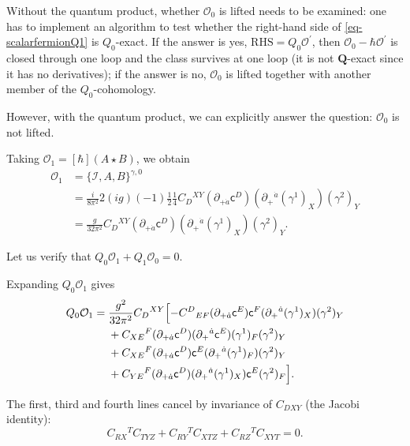 \documentclass[11pt]{article}
\numberwithin{equation}{section}
\numberwithin{figure}{section}
\numberwithin{table}{section}
\begin{document}
Without the quantum product, whether $\mathcal O_0$ is lifted needs to be examined: one has to implement an algorithm to test whether the right-hand side of \eqref{eq-scalarfermionQ1} is $Q_0$-exact. If the answer is yes, $\mathrm{RHS}=Q_0\mathcal O^{\prime}$, then $\mathcal O_0-\hbar\mathcal O^{\prime}$ is closed through one loop and the class survives at one loop (it is not $\mathbf Q$-exact since it has no derivatives); if the answer is no, $\mathcal O_0$ is lifted together with another member of the $Q_0$-cohomology.

However, with the quantum product, we can explicitly answer the question: $\mathcal O_0$ is not lifted.

Taking $\mathcal O_1=[\hbar](A\star B)$, we obtain
\begin{equation}\label{eq-2-65}
\begin{aligned}
\mathcal O_1
&=\{\mathcal I,A,B\}^{\gamma,0}\\
&={\frac{i}{8\pi^2}}
{2(ig)(-1)}
{\frac12}
{\frac14}
C_D{}^{XY}(\partial_{+\dot a}\mathsf c^D)
(\partial_+{}^{\dot a}(\gamma^1)_X)(\gamma^2)_Y\\
&=\frac{g}{32\pi^2}C_D{}^{XY}(\partial_{+\dot a}\mathsf c^D)
(\partial_+{}^{\dot a}(\gamma^1)_X)(\gamma^2)_Y.
\end{aligned}
\end{equation}

Let us verify that $Q_0\mathcal O_1+Q_1\mathcal O_0=0$.

Expanding $Q_0\mathcal O_1$ gives
\begin{equation}\label{eq-scalarfermionexpand}
\begin{aligned}
Q_0\mathcal O_1={}&\frac{g^2}{32\pi^2}C_D{}^{XY}\Bigl[
-C^D{}_{EF}(\partial_{+\dot a}\mathsf c^E)\mathsf c^F
(\partial_+{}^{\dot a}(\gamma^1)_X)(\gamma^2)_Y\\
&+C_{XE}{}^F(\partial_{+\dot a}\mathsf c^D)
(\partial_+{}^{\dot a}\mathsf c^E)(\gamma^1)_F(\gamma^2)_Y\\
&+C_{XE}{}^F(\partial_{+\dot a}\mathsf c^D)\mathsf c^E
(\partial_+{}^{\dot a}(\gamma^1)_F)(\gamma^2)_Y\\
&+C_{YE}{}^F(\partial_{+\dot a}\mathsf c^D)
(\partial_+{}^{\dot a}(\gamma^1)_X)\mathsf c^E(\gamma^2)_F
\Bigr].
\end{aligned}
\end{equation}

The first, third and fourth lines cancel by invariance of $C_{DXY}$ (the Jacobi identity):
\begin{equation}\label{b-00670}
C_{RX}{}^TC_{TYZ}+C_{RY}{}^TC_{XTZ}+C_{RZ}{}^TC_{XYT}=0.
\end{equation}
\end{document}
